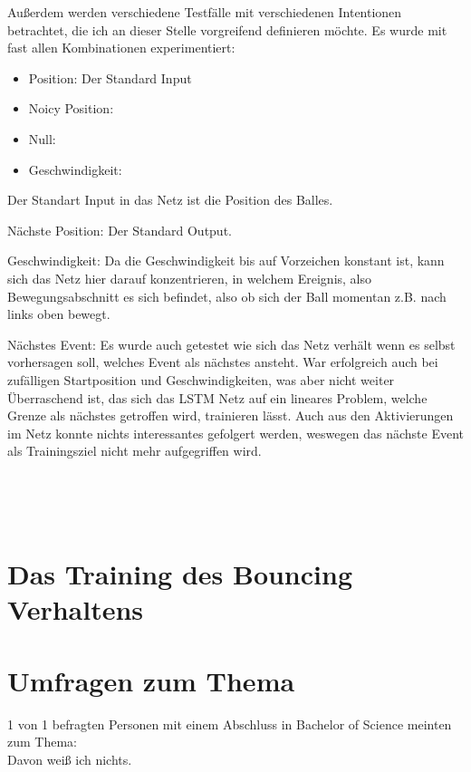 Außerdem werden verschiedene Testfälle mit verschiedenen Intentionen betrachtet, die ich an dieser Stelle vorgreifend definieren möchte. Es wurde mit fast allen Kombinationen experimentiert:
\begin{description}
	\item[Verschiedene Inputs:]
	\begin{itemize}
		\item Position: Der Standard Input
		\item Noicy Position: 
		\item Null: 
		\item Geschwindigkeit:
	\end{itemize}
	Der Standart Input in das Netz ist die Position des Balles. 
	\item[Verschiedene Trainingsziele:]
	\item Nächste Position: Der Standard Output.
	\item Geschwindigkeit: Da die Geschwindigkeit bis auf Vorzeichen konstant ist,  kann sich das Netz hier darauf konzentrieren, in welchem Ereignis, also Bewegungsabschnitt es sich befindet, also ob sich der Ball momentan z.B. nach links oben bewegt.  
	\item Nächstes Event: Es wurde auch getestet wie sich das Netz verhält wenn es selbst vorhersagen soll, welches Event als nächstes ansteht. War erfolgreich auch bei zufälligen Startposition und Geschwindigkeiten, was aber nicht weiter Überraschend ist, das sich das LSTM Netz auf ein lineares Problem, welche Grenze als nächstes getroffen wird, trainieren lässt. Auch aus den Aktivierungen im Netz konnte nichts interessantes gefolgert werden, weswegen das nächste Event als Trainingsziel nicht mehr aufgegriffen wird. 
	\item[Startposition und Geschwindigkeit:]\hfill \\
	
	\item[Feedback:]\hfill \\
\end{description}


\section{Das Training des Bouncing Verhaltens}

\section{Umfragen zum Thema}
1 von 1 befragten Personen mit einem Abschluss in Bachelor of Science meinten zum Thema: \\
Davon weiß ich nichts. \cite{bib:lstm}


